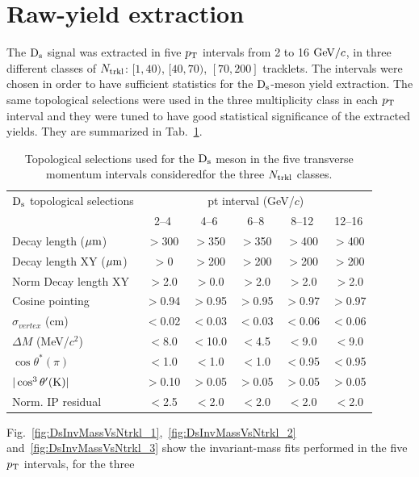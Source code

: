 \section {Raw-yield extraction}
\label{sec:Rawyields_vs_mult}
The ${\rm D_s}$ signal was extracted in five $p_{\rm T}$ intervals from 2 to 16 $\mathrm{GeV}/c$, 
in three different classes of $N_{\rm trkl}$: $[1,40)$, $[40,70)$, $[70,200]$ tracklets.
The intervals were chosen in order to have sufficient statistics for the ${\rm D_s}$-meson yield extraction.
The same topological selections were used in the three multiplicity class in each $p_{\rm T}$
interval and they were tuned to have good statistical significance of the extracted yields.
They are summarized in Tab.~\ref{tab:cutsDsVsNtrkl}.
\begin{table}[h!]
\centering
\begin{tabular}{|l|c|c|c|c|c|}
\hline
${\rm D_s}$ topological selections & \multicolumn{5}{c|}{pt interval (GeV/$c$)}\\
\cline{2-6}
  & 2--4  & 4--6 & 6--8 & 8--12 & 12--16\\
\hline
Decay length ($\mathrm{\mu m}$)        & $>$300 & $>$350 & $>$350 & $>$400& $>$400\\
Decay length XY ($\mathrm{\mu m}$)     & $>$0 & $>$200 & $>$200 & $>$200 & $>$200\\
Norm Decay length XY          & $>$2.0& $>$0.0 & $>$2.0 & $>$2.0 & $>$2.0\\
Cosine pointing              & $>$0.94 & $>$0.95 & $>$0.95 & $>$0.97 & $>$0.97\\
$\sigma_{vertex}$  (cm)          & $<$0.02 & $<$0.03 & $<$0.03 & $<$0.06 & $<$0.06\\
$\Delta M$ (MeV/$c^{2}$) & $<$8.0 & $<$10.0 & $<$4.5 & $<$9.0 & $<$9.0\\
$\cos \theta^*(\pi)$    & $<$1.0 & $<$1.0 & $<$1.0 & $<$0.95 & $<$0.95\\
$|\cos^3 \theta^\prime({\rm K})|$        & $>$0.10 & $>$0.05 & $>$0.05 & $>$0.05 & $>$0.05\\
Norm. IP residual  & $<$2.5 & $<$2.0 & $<$2.0 & $<$2.0  & $<$2.0 \\
\hline
\end{tabular}
\caption{Topological selections used for the ${\rm D_s}$ meson in the five transverse momentum intervals consideredfor the three $N_{\rm trkl}$ classes.}
\label{tab:cutsDsVsNtrkl}
\end{table}
Fig.~\ref{fig:DsInvMassVsNtrkl_1},~\ref{fig:DsInvMassVsNtrkl_2} and~\ref{fig:DsInvMassVsNtrkl_3} 
show the invariant-mass fits performed in the five $p_{\rm T}$ intervals, for the three 

